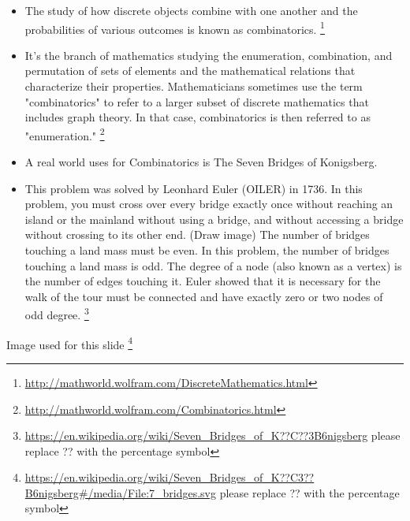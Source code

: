 \documentclass{amsart}
\theoremstyle{definition}
\theoremstyle{remark}
\numberwithin{equation}{section}
\begin{document}
\begin{itemize}
\item The study of how discrete objects combine with one another and the probabilities of various outcomes is known as combinatorics.%
\footnote{\url{http://mathworld.wolfram.com/DiscreteMathematics.html}}%
\item It’s the branch of mathematics studying the enumeration, combination, and permutation of sets of elements and the mathematical relations that characterize their properties. Mathematicians sometimes use the term "combinatorics" to refer to a larger subset of discrete mathematics that includes graph theory. In that case, combinatorics is then referred to as "enumeration."%
\footnote{\url{http://mathworld.wolfram.com/Combinatorics.html}}%
\end{itemize}

\begin{itemize}
\item A real world uses for Combinatorics is The Seven Bridges of Konigsberg.
\item This problem was solved by Leonhard Euler (OILER) in 1736. In this problem, you must cross over every bridge exactly once without reaching an island or the mainland without using a bridge, and without accessing a bridge without crossing to its other end. (Draw image) The number of bridges touching a land mass must be even. In this problem, the number of bridges touching a land mass is odd. The degree of a node (also known as a vertex) is the number of edges touching it. Euler showed that it is necessary for the walk of the tour must be connected and have exactly zero or two nodes of odd degree.%
\footnote{\url{https://en.wikipedia.org/wiki/Seven_Bridges_of_K??C??3B6nigsberg}
\newline
please replace ?? with the percentage symbol}%
\end{itemize}
Image used for this slide%
\footnote{\url{https://en.wikipedia.org/wiki/Seven_Bridges_of_K??C3??B6nigsberg#/media/File:7_bridges.svg}
\newline
please replace ?? with the percentage symbol}%
\end{document}
